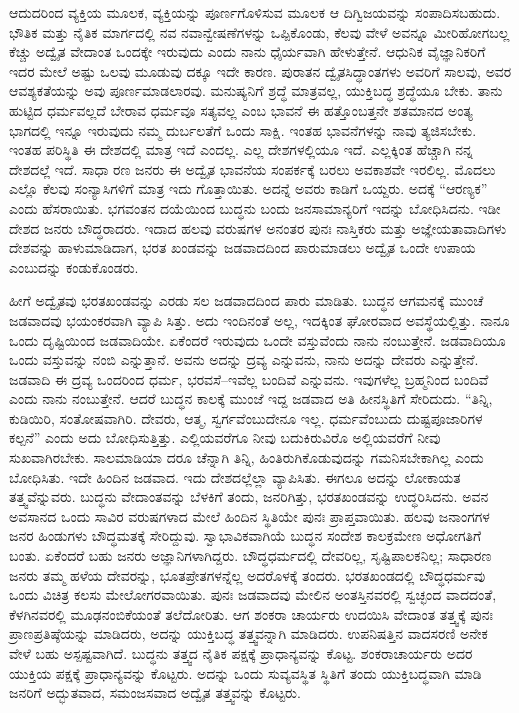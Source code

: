 ಆದುದರಿಂದ ವ್ಯಕ್ತಿಯ ಮೂಲಕ, ವ್ಯಕ್ತಿಯನ್ನು ಪೂರ್ಣಗೊಳಿಸುವ ಮೂಲಕ ಆ ದಿಗ್ವಿಜಯವನ್ನು ಸಂಪಾದಿಸಬಹುದು. ಭೌತಿಕ ಮತ್ತು ನೈತಿಕ ಮಾರ್ಗದಲ್ಲಿ ನವ ನವಾನ್ವೇಷಣೆಗಳನ್ನು ಒಪ್ಪಿಕೊಂಡು, ಕೆಲವು ವೇಳೆ ಅವನ್ನೂ ಮೀರಿಹೋಗಬಲ್ಲ ಕೆಚ್ಚು ಅದ್ವೈತ ವೇದಾಂತ ಒಂದಕ್ಕೇ ಇರುವುದು ಎಂದು ನಾನು ಧೈರ್ಯವಾಗಿ ಹೇಳುತ್ತೇನೆ. ಆಧುನಿಕ ವೈಜ್ಞಾನಿಕರಿಗೆ ಇದರ ಮೇಲೆ ಅಷ್ಟು ಒಲವು ಮೂಡುವು ದಕ್ಕೂ ಇದೇ ಕಾರಣ. ಪುರಾತನ ದ್ವೈತಸಿದ್ಧಾಂತಗಳು ಅವರಿಗೆ ಸಾಲವು, ಅವರ ಆವಶ್ಯಕತೆಯನ್ನು ಅವು ಪೂರ್ಣಮಾಡಲಾರವು. ಮನುಷ್ಯನಿಗೆ ಶ್ರದ್ಧೆ ಮಾತ್ರವಲ್ಲ, ಯುಕ್ತಿಬದ್ಧ ಶ್ರದ್ಧೆಯೂ ಬೇಕು. ತಾನು ಹುಟ್ಟಿದ ಧರ್ಮವಲ್ಲದೆ ಬೇರಾವ ಧರ್ಮವೂ ಸತ್ಯವಲ್ಲ ಎಂಬ ಭಾವನೆ ಈ ಹತ್ತೊಂಬತ್ತನೇ ಶತಮಾನದ ಅಂತ್ಯ ಭಾಗದಲ್ಲಿ ಇನ್ನೂ ಇರುವುದು ನಮ್ಮ ದುರ್ಬಲತೆಗೆ ಒಂದು ಸಾಕ್ಷಿ. ಇಂತಹ ಭಾವನೆಗಳನ್ನು ನಾವು ತ್ಯಜಿಸಬೇಕು. ಇಂತಹ ಪರಿಸ್ಥಿತಿ ಈ ದೇಶದಲ್ಲಿ ಮಾತ್ರ ಇದೆ ಎಂದಲ್ಲ. ಎಲ್ಲ ದೇಶಗಳಲ್ಲಿಯೂ ಇದೆ. ಎಲ್ಲಕ್ಕಿಂತ ಹೆಚ್ಚಾಗಿ ನನ್ನ ದೇಶದಲ್ಲೆ ಇದೆ. ಸಾಧಾ ರಣ ಜನರು ಈ ಅದ್ವೈತ ಭಾವನೆಯ ಸಂಪರ್ಕಕ್ಕೆ ಬರಲು ಅವಕಾಶವೇ ಇರಲಿಲ್ಲ. ಮೊದಲು ಎಲ್ಲೊ ಕೆಲವು ಸಂನ್ಯಾಸಿಗಳಿಗೆ ಮಾತ್ರ ಇದು ಗೊತ್ತಾಯಿತು. ಅದನ್ನೆ ಅವರು ಕಾಡಿಗೆ ಒಯ್ದರು. ಅದಕ್ಕೆ “ಆರಣ್ಯಕ” ಎಂದು ಹೆಸರಾಯಿತು. ಭಗವಂತನ ದಯೆಯಿಂದ ಬುದ್ಧನು ಬಂದು ಜನಸಾಮಾನ್ಯರಿಗೆ ಇದನ್ನು ಬೋಧಿಸಿದನು. ಇಡೀ ದೇಶದ ಜನರು ಬೌದ್ಧರಾದರು. ಇದಾದ ಹಲವು ವರುಷಗಳ ಅನಂತರ ಪುನಃ ನಾಸ್ತಿಕರು ಮತ್ತು ಅಜ್ಞೇಯತಾವಾದಿಗಳು ದೇಶವನ್ನು ಹಾಳುಮಾಡಿದಾಗ, ಭರತ ಖಂಡವನ್ನು ಜಡವಾದದಿಂದ ಪಾರುಮಾಡಲು ಅದ್ವೈತ ಒಂದೇ ಉಪಾಯ ಎಂಬುದನ್ನು ಕಂಡುಕೊಂಡರು.

ಹೀಗೆ ಅದ್ವೈತವು ಭರತಖಂಡವನ್ನು ಎರಡು ಸಲ ಜಡವಾದದಿಂದ ಪಾರು ಮಾಡಿತು. ಬುದ್ಧನ ಆಗಮನಕ್ಕೆ ಮುಂಚೆ ಜಡವಾದವು ಭಯಂಕರವಾಗಿ ವ್ಯಾಪಿ ಸಿತ್ತು. ಅದು ಇಂದಿನಂತೆ ಅಲ್ಲ, ಇದಕ್ಕಿಂತ ಘೋರವಾದ ಅವಸ್ಥೆಯಲ್ಲಿತ್ತು. ನಾನೂ ಒಂದು ದೃಷ್ಟಿಯಿಂದ ಜಡವಾದಿಯೇ. ಏಕೆಂದರೆ ಇರುವುದು ಒಂದೇ ವಸ್ತುವೆಂದು ನಾನು ನಂಬುತ್ತೇನೆ. ಜಡವಾದಿಯೂ ಒಂದು ವಸ್ತುವನ್ನು ನಂಬಿ ಎನ್ನುತ್ತಾನೆ. ಅವನು ಅದನ್ನು ದ್ರವ್ಯ ಎನ್ನುವನು, ನಾನು ಅದನ್ನು ದೇವರು ಎನ್ನುತ್ತೇನೆ. ಜಡವಾದಿ ಈ ದ್ರವ್ಯ ಒಂದರಿಂದ ಧರ್ಮ, ಭರವಸೆ–ಇವೆಲ್ಲ ಬಂದಿವೆ ಎನ್ನುವನು. ಇವುಗಳೆಲ್ಲ ಬ್ರಹ್ಮನಿಂದ ಬಂದಿವೆ ಎಂದು ನಾನು ನಂಬುತ್ತೇನೆ. ಆದರೆ ಬುದ್ಧನ ಕಾಲಕ್ಕೆ ಮುಂಜೆ ಇದ್ದ ಜಡವಾದ ಅತಿ ಹೀನಸ್ಥಿತಿಗೆ ಸೇರಿದುದು. “ತಿನ್ನಿ, ಕುಡಿಯಿರಿ, ಸಂತೋಷವಾಗಿರಿ. ದೇವರು, ಆತ್ಮ, ಸ್ವರ್ಗವೆಂಬುದೇನೂ ಇಲ್ಲ. ಧರ್ಮವೆಂಬುದು ದುಷ್ಟಪೂಜಾರಿಗಳ ಕಲ್ಪನೆ” ಎಂದು ಅದು ಬೋಧಿಸುತ್ತಿತ್ತು. ಎಲ್ಲಿಯವರೆಗೂ ನೀವು ಬದುಕಿರುವಿರೊ ಅಲ್ಲಿಯವರೆಗೆ ನೀವು ಸುಖವಾಗಿರಬೇಕು. ಸಾಲಮಾಡಿಯಾ ದರೂ ಚೆನ್ನಾಗಿ ತಿನ್ನಿ, ಹಿಂತಿರುಗಿಕೊಡುವುದನ್ನು ಗಮನಿಸಬೇಕಾಗಿಲ್ಲ ಎಂದು ಬೋಧಿಸಿತು. ಇದೇ ಹಿಂದಿನ ಜಡವಾದ. ಇದು ದೇಶದಲ್ಲೆಲ್ಲಾ ವ್ಯಾಪಿಸಿತು. ಈಗಲೂ ಅದನ್ನು ಲೋಕಾಯತ ತತ್ತ್ವವೆನ್ನುವರು. ಬುದ್ಧನು ವೇದಾಂತವನ್ನು ಬೆಳಕಿಗೆ ತಂದು, ಜನರಿಗಿತ್ತು, ಭರತಖಂಡವನ್ನು ಉದ್ಧರಿಸಿದನು. ಅವನ ಅವಸಾನದ ಒಂದು ಸಾವಿರ ವರುಷಗಳಾದ ಮೇಲೆ ಹಿಂದಿನ ಸ್ಥಿತಿಯೇ ಪುನಃ ಪ್ರಾಪ್ತವಾಯಿತು. ಹಲವು ಜನಾಂಗಗಳ ಜನರ ಹಿಂಡುಗಳು ಬೌದ್ಧಮತಕ್ಕೆ ಸೇರಿದ್ದುವು. ಸ್ವಾಭಾವಿಕವಾಗಿಯೆ ಬುದ್ಧನ ಸಂದೇಶ ಕಾಲಕ್ರಮೇಣ ಅಧೋಗತಿಗೆ ಬಂತು. ಏಕೆಂದರೆ ಬಹು ಜನರು ಅಜ್ಞಾನಿಗಳಾಗಿದ್ದರು. ಬೌದ್ಧಧರ್ಮದಲ್ಲಿ ದೇವರಿಲ್ಲ, ಸೃಷ್ಟಿಪಾಲಕನಿಲ್ಲ; ಸಾಧಾರಣ ಜನರು ತಮ್ಮ ಹಳೆಯ ದೇವರನ್ನು, ಭೂತಪ್ರೇತಗಳನ್ನೆಲ್ಲ ಅದರೊಳಕ್ಕೆ ತಂದರು. ಭರತಖಂಡದಲ್ಲಿ ಬೌದ್ಧಧರ್ಮವು ಒಂದು ವಿಚಿತ್ರ ಕಲಸು ಮೇಲೋಗರವಾಯಿತು. ಪುನಃ ಜಡವಾದವು ಮೇಲಿನ ಅಂತಸ್ತಿನವರಲ್ಲಿ ಸ್ವಚ್ಛಂದ ವಾದದಂತೆ, ಕೆಳಗಿನವರಲ್ಲಿ ಮೂಢನಂಬಿಕೆಯಂತೆ ತಲೆದೋರಿತು. ಆಗ ಶಂಕರಾ ಚಾರ್ಯರು ಉದಯಿಸಿ ವೇದಾಂತ ತತ್ತ್ವಕ್ಕೆ ಪುನಃ ಪ್ರಾಣಪ್ರತಿಷ್ಠೆಯನ್ನು ಮಾಡಿದರು, ಅದನ್ನು ಯುಕ್ತಿಬದ್ಧ ತತ್ತ್ವವನ್ನಾಗಿ ಮಾಡಿದರು. ಉಪನಿಷತ್ತಿನ ವಾದಸರಣಿ ಅನೇಕ ವೇಳೆ ಬಹು ಅಸ್ಪಷ್ಟವಾಗಿದೆ. ಬುದ್ಧನು ತತ್ತ್ವದ ನೈತಿಕ ಪಕ್ಷಕ್ಕೆ ಪ್ರಾಧಾನ್ಯವನ್ನು ಕೊಟ್ಟ. ಶಂಕರಾಚಾರ್ಯರು ಅದರ ಯುಕ್ತಿಯ ಪಕ್ಷಕ್ಕೆ ಪ್ರಾಧಾನ್ಯವನ್ನು ಕೊಟ್ಟರು. ಅದನ್ನು ಒಂದು ಸುವ್ಯವಸ್ಥಿತ ಸ್ಥಿತಿಗೆ ತಂದು ಯುಕ್ತಿಬದ್ಧವಾಗಿ ಮಾಡಿ ಜನರಿಗೆ ಅದ್ಭುತವಾದ, ಸಮಂಜಸವಾದ ಅದ್ವೈತ ತತ್ತ್ವವನ್ನು ಕೊಟ್ಟರು.

